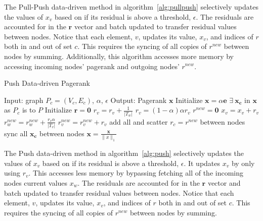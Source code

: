 \documentclass[letterpaper,12pt,onecolumn]{article}
\begin{document}
The Pull-Push data-driven method in algorithm~\ref{alg:pullpush} selectively updates the values of $x_v$ based on if its residual is above a threshold, $\epsilon$. The residuals are accounted for in the $\mathbf{r}$ vector and batch updated to transfer residual values between nodes. Notice that each element, $v$, updates its value, $x_v$, and indices of $r$ both in and out of set $c$. This requires the syncing of all copies of $r^{new}$ between nodes by summing. Additionally, this algorithm accesses more memory by accessing incoming nodes' pagerank and outgoing nodes' $r^{new}$.

\begin{algorithm}
\caption{Push Data-driven Pagerank}
\label{alg:push}
\begin{algorithmic}[1]
  \STATE Input: graph $P_{c} = (V_c, E_c)$, $\alpha$, $\epsilon$
  \STATE Output: Pagerank $\mathbf{x}$
  \STATE Initialize $\mathbf{x} = \alpha \mathbf{e}$
  \STATE $\exists  \medspace \mathbf{x_c}$ in $\mathbf{x}$ as $P_c$ is to $P$
  \STATE Initialize $\mathbf{r} = \mathbf{0}$
		\STATE $r_v = r_v + \frac{1}{|T_w|}$
	\ENDFOR
	\STATE $r_v = (1 - \alpha)\alpha r_v$
  \ENDFOR
	\STATE $r^{new} = \mathbf{0}$
			\STATE $x_{v} = x_{v} + r_v $
				\STATE $r_w^{new} = r_w^{new} + \frac{r_v \alpha}{|T_v|}$
			\ENDFOR
		\ELSE
			\STATE $r_v^{new} = r_v^{new} + r_v$
		\ENDIF
	\ENDFOR
	\STATE add all and scatter $ r_c = r^{new}$ between nodes
  \ENDWHILE
\STATE sync all $\mathbf{x_c}$ between nodes
  \STATE $\mathbf{x} = \frac{\mathbf{x} }{\|x\|_{1}}$
\end{algorithmic}
\end{algorithm}

The Push data-driven method in algorithm~\ref{alg:push} selectively updates the values of $x_v$ based on if its residual is above a threshold, $\epsilon$. It updates $x_v$ by only using $r_v$. This accesses less memory by bypassing fetching all of the incoming nodes current values $x_w$. The residuals are accounted for in the $\mathbf{r}$ vector and batch updated to transfer residual values between nodes. Notice that each element, $v$, updates its value, $x_v$, and indices of $r$ both in and out of set $c$. This requires the syncing of all copies of $r^{new}$ between nodes by summing. 
\end{document}

